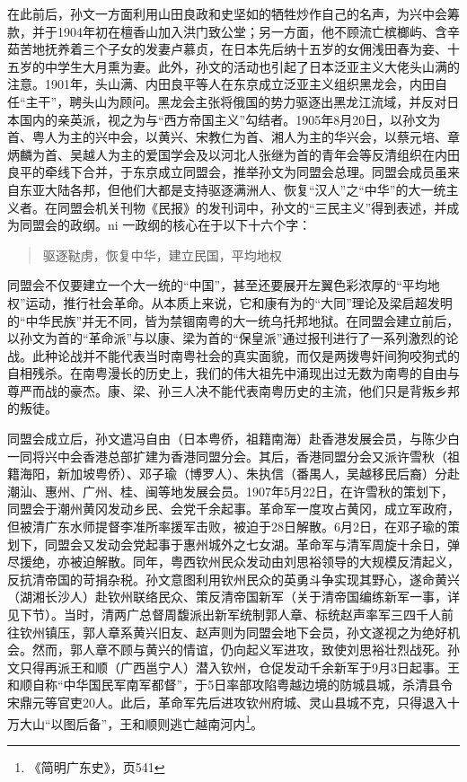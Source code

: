 在此前后，孙文一方面利用山田良政和史坚如的牺牲炒作自己的名声，为兴中会筹款，并于1904年初在檀香山加入洪门致公堂；另一方面，他不顾流亡槟榔屿、含辛茹苦地抚养着三个子女的发妻卢慕贞，在日本先后纳十五岁的女佣浅田春为妾、十五岁的中学生大月熏为妻。此外，孙文的活动也引起了日本泛亚主义大佬头山满的注意。1901年，头山满、内田良平等人在东京成立泛亚主义组织黑龙会，内田自任“主干”，聘头山为顾问。黑龙会主张将俄国的势力驱逐出黑龙江流域，并反对日本国内的亲英派，视之为与“西方帝国主义”勾结者。1905年8月20日，以孙文为首、粤人为主的兴中会，以黄兴、宋教仁为首、湘人为主的华兴会，以蔡元培、章炳麟为首、吴越人为主的爱国学会及以河北人张继为首的青年会等反清组织在内田良平的牵线下合并，于东京成立同盟会，推举孙文为同盟会总理。同盟会成员虽来自东亚大陆各邦，但他们大都是支持驱逐满洲人、恢复“汉人”之“中华”的大一统主义者。在同盟会机关刊物《民报》的发刊词中，孙文的“三民主义”得到表述，并成为同盟会的政纲。ni 一政纲的核心在于以下十六个字：

\begin{quote}
驱逐鞑虏，恢复中华，建立民国，平均地权
\end{quote}

同盟会不仅要建立一个大一统的“中国”，甚至还要展开左翼色彩浓厚的“平均地权”运动，推行社会革命。从本质上来说，它和康有为的“大同”理论及梁启超发明的“中华民族”并无不同，皆为禁锢南粤的大一统乌托邦地狱。在同盟会建立前后，以孙文为首的“革命派”与以康、梁为首的“保皇派”通过报刊进行了一系列激烈的论战。此种论战并不能代表当时南粤社会的真实面貌，而仅是两拨粤奸间狗咬狗式的自相残杀。在南粤漫长的历史上，我们的伟大祖先中涌现出过无数为南粤的自由与尊严而战的豪杰。康、梁、孙三人决不能代表南粤历史的主流，他们只是背叛乡邦的叛徒。

同盟会成立后，孙文遣冯自由（日本粤侨，祖籍南海）赴香港发展会员，与陈少白一同将兴中会香港总部扩建为香港同盟分会。其后，香港同盟分会又派许雪秋（祖籍海阳，新加坡粤侨）、邓子瑜（博罗人）、朱执信（番禺人，吴越移民后裔）分赴潮汕、惠州、广州、桂、闽等地发展会员。1907年5月22日，在许雪秋的策划下，同盟会于潮州黄冈发动乡民、会党千余起事。革命军一度攻占黄冈，成立军政府，但被清广东水师提督李准所率援军击败，被迫于28日解散。6月2日，在邓子瑜的策划下，同盟会又发动会党起事于惠州城外之七女湖。革命军与清军周旋十余日，弹尽援绝，亦被迫解散。同年，粤西钦州民众发动由刘思裕领导的大规模反清起义，反抗清帝国的苛捐杂税。孙文意图利用钦州民众的英勇斗争实现其野心，遂命黄兴（湖湘长沙人）赴钦州联络民众、策反清帝国新军（关于清帝国编练新军一事，详见下节）。当时，清两广总督周馥派出新军统制郭人章、标统赵声率军三四千人前往钦州镇压，郭人章系黄兴旧友、赵声则为同盟会地下会员，孙文遂视之为绝好机会。然而，郭人章不顾与黄兴的情谊，仍向起义军进攻，致使刘思裕壮烈战死。孙文只得再派王和顺（广西邕宁人）潜入钦州，仓促发动千余新军于9月3日起事。王和顺自称“中华国民军南军都督”，于5日率部攻陷粤越边境的防城县城，杀清县令宋鼎元等官吏20人。此后，革命军先后进攻钦州府城、灵山县城不克，只得退入十万大山“以图后备”，王和顺则逃亡越南河内\footnote{《简明广东史》，页541}。

